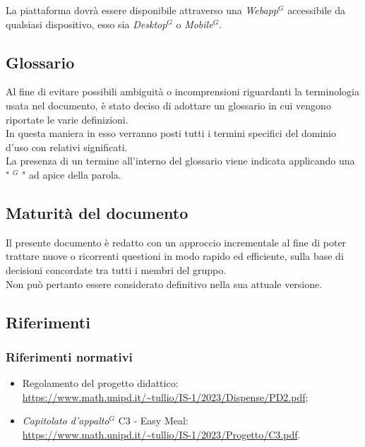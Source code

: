     La piattaforma dovrà essere disponibile attraverso una \emph{Webapp}$^{G}$ accessibile da qualsiasi dispositivo, esso sia \emph{Desktop}$^{G}$ o \emph{Mobile}$^{G}$.

    \subsection{Glossario}

    Al fine di evitare possibili ambiguità o incomprensioni riguardanti la terminologia usata nel documento, è stato deciso di adottare un glossario in cui vengono riportate le varie definizioni. \\
    In questa maniera in esso verranno posti tutti i termini specifici del dominio d’uso con relativi significati. \\
    La presenza di un termine all’interno del glossario viene indicata applicando una " $^{G}$ " ad apice della parola.

    \subsection{Maturità del documento}

    Il presente documento è redatto con un approccio incrementale al fine di poter trattare nuove o ricorrenti questioni in modo rapido ed efficiente, sulla base di decisioni concordate tra tutti i membri del gruppo. \\
    Non può pertanto essere considerato definitivo nella sua attuale versione.

    \subsection{Riferimenti}

        \subsubsection{Riferimenti normativi}

\begin{itemize}
\item Regolamento del progetto didattico: \\ \url{https://www.math.unipd.it/~tullio/IS-1/2023/Dispense/PD2.pdf};
\item \emph{Capitolato d’appalto}$^{G}$ C3 - Easy Meal: \\ \url{https://www.math.unipd.it/~tullio/IS-1/2023/Progetto/C3.pdf}.
\end{itemize}

